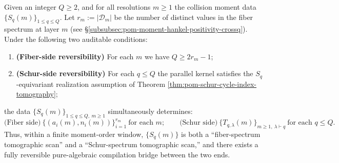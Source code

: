 \begin{theorem}\label{thm:pom-fiber-schur-bidirectional-compilation}
Given an integer \(Q\ge 2\), and for all resolutions \(m\ge 1\) the collision moment data \(\{S_q(m)\}_{1\le q\le Q}\).
Let \(r_m:=|\mathcal{D}_m|\) be the number of distinct values in the fiber spectrum at layer \(m\) (see \S\ref{subsubsec:pom-moment-hankel-positivity-crossq}).
Under the following two auditable conditions:
\begin{enumerate}
  \item \textbf{(Fiber-side reversibility)} For each \(m\) we have \(Q\ge 2r_m-1\);
  \item \textbf{(Schur-side reversibility)} For each \(q\le Q\) the parallel kernel satisfies the \(S_q\)-equivariant realization assumption of Theorem \ref{thm:pom-schur-cycle-index-tomography};
\end{enumerate}
the data \(\{S_q(m)\}_{1\le q\le Q,\ m\ge 1}\) simultaneously determines:
\[
\text{(Fiber side)}\ \{(a_i(m),n_i(m))\}_{i=1}^{r_m}\ \text{for each }m;\qquad
\text{(Schur side)}\ \{T_{q,\lambda}(m)\}_{m\ge 1,\ \lambda\vdash q}\ \text{for each }q\le Q.
\]
Thus, within a finite moment-order window, \(\{S_q(m)\}\) is both a ``fiber-spectrum tomographic scan'' and a ``Schur-spectrum tomographic scan,'' and there exists a fully reversible pure-algebraic compilation bridge between the two ends.
\end{theorem}

